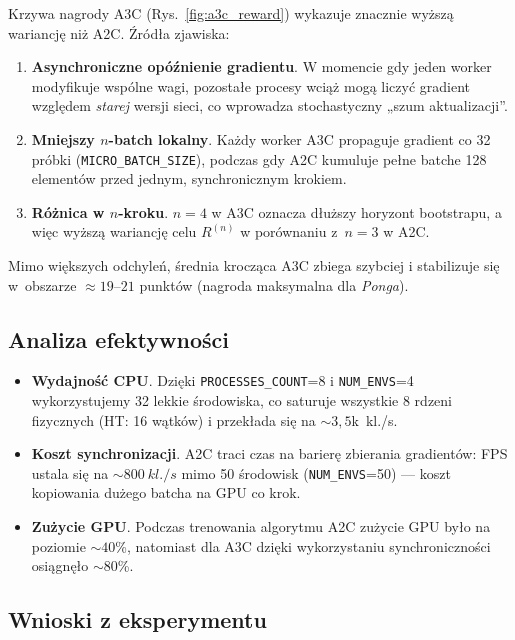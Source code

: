 \documentclass[12pt,a4paper]{article}
\begin{document}
Krzywa nagrody A3C (Rys.~\ref{fig:a3c_reward})
wykazuje znacznie wyższą wariancję niż A2C.
Źródła zjawiska:

\begin{enumerate}
  \item \textbf{Asynchroniczne opóźnienie gradientu}.  
        W momencie gdy jeden worker modyfikuje wspólne wagi,
        pozostałe procesy wciąż mogą liczyć gradient
        względem \emph{starej} wersji sieci,
        co wprowadza stochastyczny „szum aktualizacji”.
  \item \textbf{Mniejszy $n$-batch lokalny}.  
        Każdy worker A3C propaguje gradient co 32 próbki
        (\texttt{MICRO\_BATCH\_SIZE}), podczas gdy
        A2C kumuluje pełne batche 128 elementów
        przed jednym, synchronicznym krokiem.
  \item \textbf{Różnica w $n$-kroku}.  
        $n=4$ w A3C oznacza dłuższy horyzont bootstrapu,
        a więc wyższą wariancję celu $R^{(n)}$ w porównaniu
        z~$n=3$ w A2C.
\end{enumerate}

Mimo większych odchyleń, średnia krocząca A3C
zbiega szybciej i stabilizuje się w~obszarze \( \approx 19\text{–}21\)
punktów (nagroda maksymalna dla \emph{Ponga}).

\subsection{Analiza efektywności}

\begin{itemize}
  \item \textbf{Wydajność CPU}.  
        Dzięki \texttt{PROCESSES\_COUNT}=8 i
        \texttt{NUM\_ENVS}=4 wykorzystujemy 32 lekkie środowiska,
        co saturuje wszystkie 8 rdzeni fizycznych
        (HT: 16 wątków) i przekłada się na
        \(\sim3{,}5\)k~kl./s.
  \item \textbf{Koszt synchronizacji}.  
        A2C traci czas na barierę zbierania gradientów:
        FPS ustala się na \(\sim 800~kl./s\) mimo
        50 środowisk (\texttt{NUM\_ENVS}=50) — koszt kopiowania
        dużego batcha na GPU co krok.
  \item \textbf{Zużycie GPU}. 
        Podczas trenowania algorytmu A2C zużycie GPU było na poziomie \(\sim 40\)\%,
        natomiast dla A3C dzięki wykorzystaniu synchroniczności osiągnęło \(\sim 80 \)\%.
\end{itemize}

\subsection*{Wnioski z eksperymentu}
\end{document}
